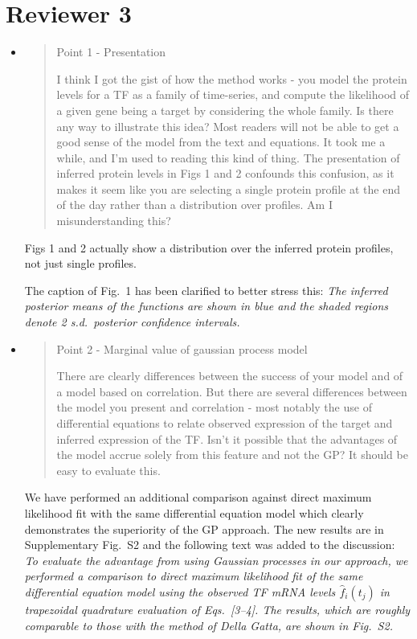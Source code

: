 \documentclass{article}
\begin{document}
\newpage

\section*{Reviewer 3}

\begin{itemize}
\item \begin{quote}
Point 1 - Presentation 

I think I got the gist of how the method works - you model the protein
levels for a TF as a family of time-series, and compute the likelihood
of a given gene being a target by considering the whole family. Is
there any way to illustrate this idea? Most readers will not be able
to get a good sense of the model from the text and equations. It took
me a while, and I'm used to reading this kind of thing. The
presentation of inferred protein levels in Figs 1 and 2 confounds this
confusion, as it makes it seem like you are selecting a single protein
profile at the end of the day rather than a distribution over
profiles. Am I misunderstanding this?
\end{quote}

Figs 1 and 2 actually show a distribution over the inferred protein
profiles, not just single profiles.

The caption of Fig.~1 has been clarified to better stress this:
\emph{The inferred posterior means of the functions are shown in blue
  and the shaded regions denote 2 s.d.\ posterior confidence
  intervals.}

\item \begin{quote}
Point 2 - Marginal value of gaussian process model 

There are clearly differences between the success of your model and of
a model based on correlation. But there are several differences
between the model you present and correlation - most notably the use
of differential equations to relate observed expression of the target
and inferred expression of the TF. Isn't it possible that the
advantages of the model accrue solely from this feature and not the
GP? It should be easy to evaluate this.
\end{quote}

We have performed an additional comparison against direct maximum
likelihood fit with the same differential equation model which clearly
demonstrates the superiority of the GP approach.  The new results are
in Supplementary Fig.~S2 and the following text was added to the
discussion:
\emph{To evaluate the advantage from using Gaussian processes in our
approach, we performed a comparison to direct maximum likelihood fit
of the same differential equation model using the observed TF mRNA
levels $\hat{f}_i(t_j)$ in trapezoidal quadrature evaluation of
Eqs.~[3--4].  The
results, which are roughly comparable to those with the method of
Della Gatta, are shown in Fig.~S2.}


\end{itemize}
\end{document}
